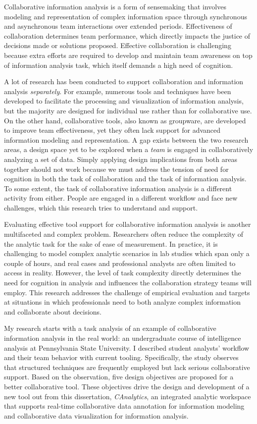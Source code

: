 
Collaborative information analysis is a form of sensemaking that involves modeling and representation of complex information space through synchronous and asynchronous team interactions over extended periods. Effectiveness of collaboration determines team performance, which directly impacts the justice of decisions made or solutions proposed. Effective collaboration is challenging because extra efforts are required to develop and maintain team awareness on top of information analysis task, which itself demands a high need of cognition.

A lot of research has been conducted to support collaboration and information analysis \textit{separately}. For example, numerous tools and techniques have been developed to facilitate the processing and visualization of information analysis, but the majority are designed for individual use rather than for collaborative use. On the other hand, collaborative tools, also known as groupware, are developed to improve team effectiveness, yet they often lack support for advanced information modeling and representation. A gap exists between the two research areas, a design space yet to be explored when a \textit{team} is engaged in collaboratively analyzing a set of data. Simply applying design implications from both areas together should not work because we must address the tension of need for cognition in both the task of collaboration and the task of information analysis. To some extent, the task of collaborative information analysis is a different activity from either. People are engaged in a different workflow and face new challenges, which this research tries to understand and support.

Evaluating effective tool support for collaborative information analysis is another multifaceted and complex problem. Researchers often reduce the complexity of the analytic task for the sake of ease of measurement. In practice, it is challenging to model complex analytic scenarios in lab studies which span only a couple of hours, and real cases and professional analysts are often limited to access in reality. However, the level of task complexity directly determines the need for cognition in analysis and influences the collaboration strategy teams will employ. This research addresses the challenge of empirical evaluation and targets at situations in which professionals need to both analyze complex information and collaborate about decisions.

My research starts with a task analysis of an example of collaborative information analysis in the real world: an undergraduate course of intelligence analysis at Pennsylvania State University. I described student analysts' workflow and their team behavior with current tooling. Specifically, the study observes that structured techniques are frequently employed but lack serious collaborative support. Based on the observation, five design objectives are proposed for a better collaborative tool. These objectives drive the design and development of a new tool out from this dissertation, \textit{CAnalytics}, an integrated analytic workspace that supports real-time collaborative data annotation for information modeling and collaborative data visualization for information analysis. 

